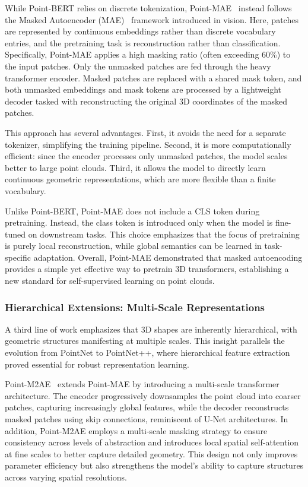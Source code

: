 While Point-BERT relies on discrete tokenization, Point-MAE~\cite{pmae} instead follows the Masked Autoencoder (MAE)~\cite{mae} framework introduced in vision. Here, patches are represented by continuous embeddings rather than discrete vocabulary entries, and the pretraining task is reconstruction rather than classification. Specifically, Point-MAE applies a high masking ratio (often exceeding 60\%) to the input patches. Only the unmasked patches are fed through the heavy transformer encoder. Masked patches are replaced with a shared mask token, and both unmasked embeddings and mask tokens are processed by a lightweight decoder tasked with reconstructing the original 3D coordinates of the masked patches.

This approach has several advantages. First, it avoids the need for a separate tokenizer, simplifying the training pipeline. Second, it is more computationally efficient: since the encoder processes only unmasked patches, the model scales better to large point clouds. Third, it allows the model to directly learn continuous geometric representations, which are more flexible than a finite vocabulary.

Unlike Point-BERT, Point-MAE does not include a CLS token during pretraining. Instead, the class token is introduced only when the model is fine-tuned on downstream tasks. This choice emphasizes that the focus of pretraining is purely local reconstruction, while global semantics can be learned in task-specific adaptation. Overall, Point-MAE demonstrated that masked autoencoding provides a simple yet effective way to pretrain 3D transformers, establishing a new standard for self-supervised learning on point clouds.

\subsubsection{Hierarchical Extensions: Multi-Scale Representations}
\label{sssec:hierarchical_extensions}

A third line of work emphasizes that 3D shapes are inherently hierarchical, with geometric structures manifesting at multiple scales. This insight parallels the evolution from PointNet to PointNet++, where hierarchical feature extraction proved essential for robust representation learning. 

Point-M2AE~\cite{pm2ae} extends Point-MAE by introducing a multi-scale transformer architecture. The encoder progressively downsamples the point cloud into coarser patches, capturing increasingly global features, while the decoder reconstructs masked patches using skip connections, reminiscent of U-Net architectures. In addition, Point-M2AE employs a multi-scale masking strategy to ensure consistency across levels of abstraction and introduces local spatial self-attention at fine scales to better capture detailed geometry. This design not only improves parameter efficiency but also strengthens the model’s ability to capture structures across varying spatial resolutions.

